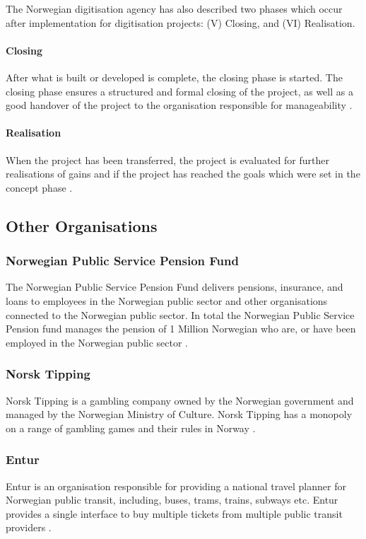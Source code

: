 The Norwegian digitisation agency has also described two phases which occur after implementation for digitisation projects: (V) Closing, and (VI) Realisation.

\paragraph{Closing}
After what is built or developed is complete, the closing phase is started. The closing phase ensures a structured and formal closing of the project, as well as a good handover of the project to the organisation responsible for manageability \cite{project_wizard_digdir_2023}. 

\paragraph{Realisation}
When the project has been transferred, the project is evaluated for further realisations of gains and if the project has reached the goals which were set in the concept phase \cite{project_wizard_digdir_2023}.

\subsection{Other Organisations}
\subsubsection{Norwegian Public Service Pension Fund}
The Norwegian Public Service Pension Fund delivers pensions, insurance, and loans to employees in the Norwegian public sector and other organisations connected to the Norwegian public sector. In total the Norwegian Public Service Pension fund manages the pension of 1 Million Norwegian who are, or have been employed in the Norwegian public sector \cite{statens_pensjonskasse_2023}.

\subsubsection{Norsk Tipping}
Norsk Tipping is a gambling company owned by the Norwegian government and managed by the Norwegian Ministry of Culture. Norsk Tipping has a monopoly on a range of gambling games and their rules in Norway \cite{norsk_tipping_wiki_2023}.

\subsubsection{Entur}
Entur is an organisation responsible for providing a national travel planner for Norwegian public transit, including, buses, trams, trains, subways etc. Entur provides a single interface to buy multiple tickets from multiple public transit providers \cite{entur_2023}.

